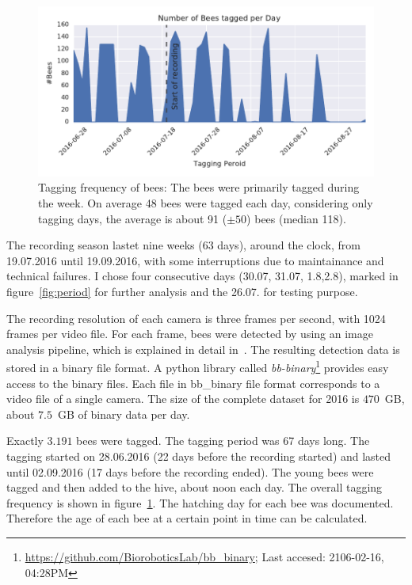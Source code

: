 \begin{figure}[htb]
	\centering
	\includegraphics[width=1.0\textwidth]{Figures/tagging_period}
	\caption[Tagging Frequency]{Tagging frequency of bees: The bees were primarily tagged during the week. On average 48 bees were tagged each day, considering only tagging days, the average is about 91 ($\pm50$) bees (median 118).}
	\label{fig:tagging}
\end{figure}

The recording season lastet nine weeks (63 days), around the clock, from 19.07.2016 until 19.09.2016, with some interruptions due to maintainance and technical failures. I chose four consecutive days (30.07, 31.07, 1.8,2.8), marked in figure~\ref{fig:period} for further analysis and the 26.07. for testing purpose.

The recording resolution of each camera is three frames per second, with 1024 frames per video file. For each frame, bees were detected by using an image analysis pipeline, which is explained in detail in~\cite{wario2015automatic}. The resulting detection data is stored in a binary file format.
A python library called \emph{bb-binary}\footnote{\url{https://github.com/BioroboticsLab/bb_binary}; Last accesed: 2106-02-16, 04:28PM} provides easy access to the binary files. Each file in bb\_binary file format corresponds to a video file of a single camera.
The size of the complete dataset for 2016 is $470$~GB, about $7.5$~GB of binary data per day.

Exactly $3.191$ bees were tagged. The tagging period was 67 days long. The tagging started on 28.06.2016 (22 days before the recording started) and lasted until 02.09.2016 (17 days before the recording ended). The young bees were tagged and then added to the hive, about noon each day. The overall tagging frequency is shown in figure~\ref{fig:tagging}. The hatching day for each bee was documented. Therefore the age of each bee at a certain point in time can be calculated.

